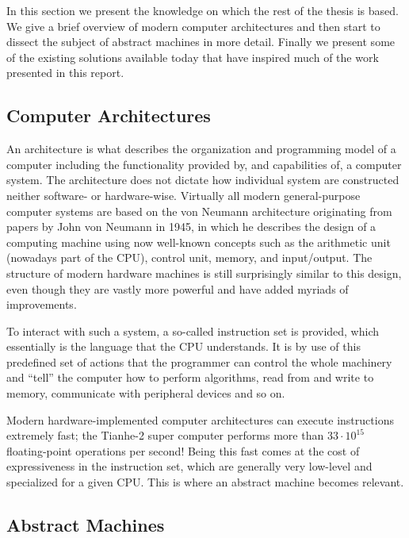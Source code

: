In this section we present the knowledge on which the rest of the thesis is
based. We give a brief overview of modern computer architectures and then start
to dissect the subject of abstract machines in more detail. Finally we present
some of the existing solutions available today that have inspired much of the
work presented in this report.

\subsection{Computer Architectures}
\label{sec:background:computer-architectures}

An architecture is what describes the organization and programming model of a
computer including the functionality provided by, and capabilities of, a
computer system\cite{clements06}. The architecture does not dictate how
individual system are constructed neither software- or hardware-wise. Virtually
all modern general-purpose computer systems are based on the von Neumann
architecture originating from papers by John von Neumann in 1945\cite{riley87},
in which he describes the design of a computing machine using now well-known
concepts such as the arithmetic unit (nowadays part of the CPU), control unit,
memory, and input/output. The structure of modern hardware machines is still
surprisingly similar to this design, even though they are vastly more powerful
and have added myriads of improvements.

To interact with such a system, a so-called instruction set is provided, which
essentially is the language that the CPU understands. It is by use of this
predefined set of actions that the programmer can control the whole machinery
and ``tell'' the computer how to perform algorithms, read from and write to
memory, communicate with peripheral devices and so on.

Modern hardware-implemented computer architectures can execute instructions
extremely fast; the Tianhe-2 super computer performs more than
$33 \cdot 10^{15}$ floating-point operations per second\cite{ieee-tianhe}! Being
this fast comes at the cost of expressiveness in the instruction set, which are
generally very low-level and specialized for a given CPU. This is where an
abstract machine becomes relevant.

\subsection{Abstract Machines}
\label{sec:background:abstract-machines}

